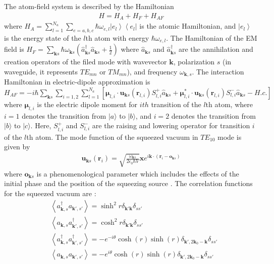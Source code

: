 \documentclass[aps,showpacs,twocolumn,twoside,groupedaddress]{revtex4}
\let\vec\bm
\begin{document}

The atom-field system is described by the Hamiltonian \begin{equation}
  \label{hamltonian}
  \begin{gathered}
H=H_{A}+H_{F}+H_{AF}
 \end{gathered}
\end{equation}
where
$H_{A}=\sum_{l=1}^{N_a}\sum_{e=a,b,c}\hbar\omega_{e,l}\left|e_{l}\right\rangle \left\langle e_{l}\right|$  
is the atomic Hamiltonian, and $ \left|e_{l}\right\rangle $ is the energy state of the $l$th atom with energy $\hbar\omega_{e,l}$. The Hamiltonian of the EM field is
$H_{F}=\sum_{\vec{k}s}\hbar\omega_{\vec{k}s}(\hat{a}_{\vec{k}s}^{\dagger}\hat{a}_{\vec{k}s}+\frac{1}{2})$
where $\hat{a}_{\vec{k}s}$ and $\hat{a}_{\vec{k}s}^{\dagger}$ are the annihilation and creation operators of the filed mode with wavevector $ \vec{k}$, polarization $s$ (in waveguide, it represents $TE_{mn}$ or $TM_{mn}$), and frequency $\omega_{\vec{k},s}$. The interaction Hamiltonian in electric-dipole approximation is
$H_{AF}=-i\hbar\sum_{\vec{k}s}\sum_{i=1,2}\sum_{l=1}^{N_{a}}[\vec{\mu}_{l,i}\cdot\vec{u}_{\vec{k}s}(\vec{r}_{l,i})S_{l,i}^{+}\hat{a}_{\vec{k}s}+\vec{\mu}_{l,i}^{*}\cdot\vec{u}_{\vec{k}s}(\vec{r}_{l,i})S_{l,i}^{-}\hat{a}_{\vec{k}s}-H.c.]$
where $ \vec{\mu}_{l,i} $ is the electric dipole moment for $ith$ transition of the $l$th atom, where $i=1$ denotes the transition from $|a\rangle$ to $|b\rangle$, and $i=2$ denotes the transition from $|b\rangle$ to $|c\rangle$. Here, $ S_{l,i}^{+} $ and $S_{l,i}^{-} $ are the raising and lowering operator for transition $i$ of the $l$th atom. The mode function of the squeezed vacuum in $TE_{10}$ mode is given by
\begin{equation}
  \label{eq2b}
  \begin{gathered}
\vec{u}_{\vec{k}s}(\vec{r}_{i})=\sqrt{\frac{\omega_{\vec{k}s}}{2\epsilon_{0}\hbar V}}\vec{x}e^{i\vec{k}\cdot(\vec{r}_{i}-\vec{o}_{\vec{k}s})}
 \end{gathered}
\end{equation}
where $\vec{o}_{\vec{k}s} $ is a phenomenological parameter which includes the effects of the initial phase and the position of the squeezing source \cite{You2018}. The correlation functions for the squeezed vacuum are \cite{scully1999quantum}:
\begin{equation}
\label{eq0a}
\begin{split}
& \left\langle a_{\vec{k},s}^{\dagger}a_{\vec{k}',s'}\right\rangle =\sinh^{2}r\delta_{\vec{k}'\vec{k}}\delta_{ss'} \\
& \left\langle a_{\vec{k},s}a_{\vec{k}',s'}^{\dagger}\right\rangle =\cosh^{2}r\delta_{\vec{k}'\vec{k}}\delta_{ss'}\\
& \left\langle a_{\vec{k},s}^{\dagger}a_{\vec{k}',s'}^{\dagger}\right\rangle =-e^{-i\theta}\cosh(r)\sinh(r)\delta_{\vec{k}',2\vec{k}_{0}-\vec{k}}\delta_{ss'}\\
&\left\langle a_{\vec{k},s}a_{\vec{k}',s'}\right\rangle =-e^{i\theta}\cosh(r)\sinh(r)\delta_{\vec{k}',2\vec{k}_{0}-\vec{k}}\delta_{ss'}
\end{split}
\end{equation}
\end{document}
